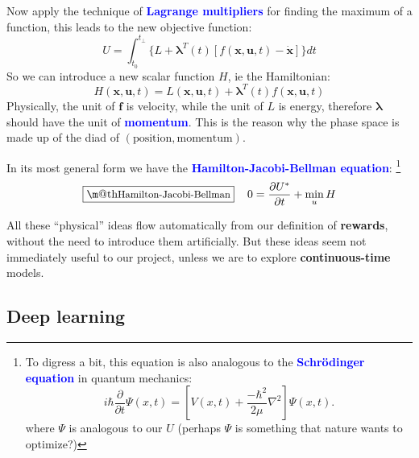 \documentclass[orivec]{llncs}
\makeatletter
\newcommand{\emp}[1]{\textbf{\textcolor{blue}{#1}}}
\newcommand{\vect}[1]{\boldsymbol{#1}}
\renewcommand{\boxed}[1]{\fbox{\m@th$\displaystyle\scalebox{0.9}{#1}$} \,}
\makeatother
\begin{document}
Now apply the technique of \emp{Lagrange multipliers} for finding the maximum of a function, this leads to the new objective function:
\begin{equation}
U = \int_{t_0}^{t_\bot} \{ L + \vect{\lambda}^T(t) \left[ f(\vect{x}, \vect{u}, t) - \dot{\vect{x}} \right] \} dt
\end{equation}
So we can introduce a new scalar function $H$, ie the Hamiltonian:
\begin{equation}
H(\vect{x}, \vect{u}, t) = L(\vect{x}, \vect{u}, t) + \vect{\lambda}^T(t) f(\vect{x}, \vect{u}, t)
\end{equation}
Physically, the unit of $\vect{f}$ is velocity, while the unit of $L$ is energy, therefore $\vect{\lambda}$ should have the unit of \emp{momentum}.  This is the reason why the phase space is made up of the diad of $(\mbox{position}, \mbox{momentum})$.

In its most general form we have the \emp{Hamilton-Jacobi-Bellman equation}: \footnote{To digress a bit, this equation is also analogous to the \emp{Schr\"{o}dinger equation} in quantum mechanics:
\begin{equation}
i \hbar \frac{\partial}{\partial t} \Psi(x,t) = \left[ V(x,t) + \frac{-\hbar^2}{2\mu} \nabla^2 \right] \Psi(x,t).
\end{equation}
where $\Psi$ is analogous to our $U$ (perhaps $\Psi$ is something that nature wants to optimize?)}
\begin{equation}
\boxed{\mbox{Hamilton-Jacobi-Bellman}} \quad
0 = \frac{\partial U^*}{\partial t} + \min_u H
\end{equation}

All these ``physical'' ideas flow automatically from our definition of \textbf{rewards}, without the need to introduce them artificially.  But these ideas seem not immediately useful to our project, unless we are to explore \textbf{continuous-time} models.

\subsection{Deep learning}
\end{document}
